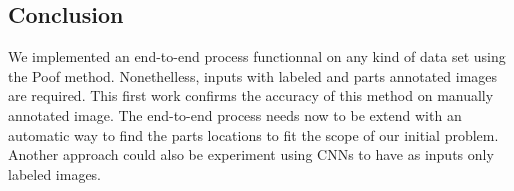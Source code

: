 \documentclass[twoside]{article}
\begin{document}
\begin{multicols}{2}
\section{Conclusion}

\noindent We implemented an end-to-end process functionnal on any kind of data set using the Poof method. Nonethelless, inputs with labeled and parts annotated images are required. This first work confirms the accuracy of this method on manually annotated image. The end-to-end process needs now to be extend with an automatic way to find the parts locations to fit the scope of our initial problem. Another approach could also be experiment using CNNs to have as inputs only labeled images.


\nocite{*} %


\end{multicols}

\newpage
\end{document}
